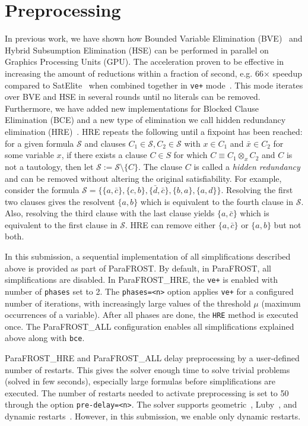 \documentclass[conference]{IEEEtran}
\newcommand{\parafrost}{ParaFROST\xspace}
\newcommand{\parafrostHRE}{ParaFROST\_HRE\xspace}
\newcommand{\parafrostALL}{ParaFROST\_ALL\xspace}
\begin{document}
\section{Preprocessing}
In previous work, we have shown how Bounded Variable Elimination (BVE)~\cite{niver,satelite} and Hybrid Subsumption Elimination (HSE) can be performed in parallel on Graphics Processing Units (GPU). The acceleration proven to be effective in increasing the amount of reductions within a fraction of second, e.g. 66$\times$ speedup compared to SatElite~\cite{satelite} when combined together in \texttt{ve+} mode~\cite{sigmaTacas}. This mode iterates over BVE and HSE in several rounds until no literals can be removed. 
Furthermore, we have added new implementations for Blocked Clause Elimination (BCE) and a new type
of elimination we call hidden redundancy elimination (HRE)~\cite{sigmaIfm}. HRE repeats the following until a fixpoint has been reached: for a given formula $\mathcal{S}$ and clauses $C_1\in\mathcal{S},C_2\in\mathcal{S}$ with $x\in C_1$ and $\bar{x}\in C_2$ for some variable $x$, if there exists a clause $C\in S$ for which $C\equiv C_1 \otimes_{x} C_2$ and $C$ is not a tautology, then let $\mathcal{S} := \mathcal{S} \setminus \{C\}$. The clause $C$ is called a \emph{hidden redundancy} and can be removed without altering the original satisfiability.
For example, consider the formula $\mathcal{S}=\{\{a,\bar{c}\},\{c,b\},\{\bar{d},\bar{c}\},\{b, a\},\{a,d\}\}$.
Resolving the first two clauses gives the resolvent $\{a,b\}$ which is equivalent to the fourth clause in $\mathcal{S}$. Also, resolving the third clause with the last clause yields $\{a,\bar{c}\}$ which is equivalent to the first clause in $\mathcal{S}$. HRE can remove either $\{a,\bar{c}\}$ or $\{a,b\}$ but not both.

In this submission, a sequential implementation of all simplifications described above is provided as part of \parafrost. By default, in \parafrost, all simplifications are disabled. 
In \parafrostHRE, the \texttt{ve+} is enabled with number of \texttt{phases} set to 2. The \texttt{phases=<n>} option applies \texttt{ve+} for a configured number of iterations, with increasingly large values of the threshold $\mu$ (maximum occurrences of a variable). After all phases are done, the \texttt{HRE} method is executed once. The \parafrostALL configuration enables all simplifications explained above along with \texttt{bce}.

\parafrostHRE and \parafrostALL delay preprocessing by a user-defined number of restarts. This gives the solver enough time to solve trivial problems (solved in few seconds), especially large formulas before simplifications are executed. The number of restarts needed to activate preprocessing is set to 50 through the option \texttt{pre-delay=<n>}. The solver supports geometric~\cite{geoRestart}, Luby~\cite{minisat}, and dynamic restarts~\cite{dynamicRestarts}. However, in this submission, we enable only dynamic restarts.
%
%
\end{document}

